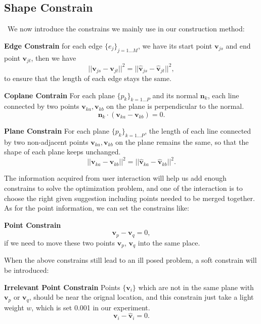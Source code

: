 \documentclass[submission]{gmp2018}
\begin{document}
\subsection{Shape Constrain}\
We now introduce the constrains we mainly use in our construction method:

\noindent
\textbf{Edge Constrain} for each edge $\{e_j\}_{j=1...M}$, we have its start point $\mathbf{v}_{js}$ and end point $\mathbf{v}_{jt}$, then we have 
\begin{equation}
||\mathbf{v}_{js} - \mathbf{v}_{jt}||^2 = ||\mathbf{\hat{v}}_{js} - \mathbf{\hat{v}}_{jt}||^2,
\label{equ:edge}
\end{equation}
to ensure that the length of each edge stays the same.

\noindent
\textbf{Coplane Contrain} For each plane $\{p_k\}_{k=1 \dots P}$ and its normal $\mathbf{n}_k$, each line connected by two points $\mathbf{v}_{ka}, \mathbf{v}_{kb}$ on the plane is perpendicular to the normal.
\begin{equation}
\mathbf{n}_k \cdot (\mathbf{v}_{ka} - \mathbf{v}_{kb}) = 0.
\label{equ:coplane}
\end{equation}

\noindent
\textbf{Plane Constrain} For each plane $\{p_k\}_{k=1 \dots P}$, the length of each line connected by two non-adjacent points $\mathbf{v}_{ka}, \mathbf{v}_{kb}$ on the plane remains the same, so that the shape of each plane keeps unchanged.
\begin{equation}
||\mathbf{v}_{ka} - \mathbf{v}_{kb}||^2 = ||\hat{\mathbf{v}}_{ka} - \hat{\mathbf{v}}_{kb}||^2.
\label{equ:plane}
\end{equation}

The information acquired from user interaction will help us add enough constrains to solve the optimization problem, and one of the interaction is to choose the right given suggestion including points needed to be merged together. As for the point information, we can set the constrains like:

\noindent
\textbf{Point Constrain} 
\begin{equation}
\mathbf{v}_p - \mathbf{v}_q = 0,
\label{equ:point}
\end{equation}
if we need to move these two points $\mathbf{v}_p$, $\mathbf{v}_q$ into the same place.

When the above constrains still lead to an ill posed problem, a soft constrain will be introduced:

\noindent
\textbf{Irrelevant Point Constrain} Points $\{\mathbf{v}_i\}$ which are not in the same plane with $\mathbf{v}_p$ or $\mathbf{v}_q$, should be near the orignal location, and this constrain just take a light weight $w$, which is set 0.001 in our experiment. 
\begin{equation}
\mathbf{v}_i - \mathbf{\hat{v}}_i = 0.
\label{equ:irrelevant}
\end{equation}
\end{document}

